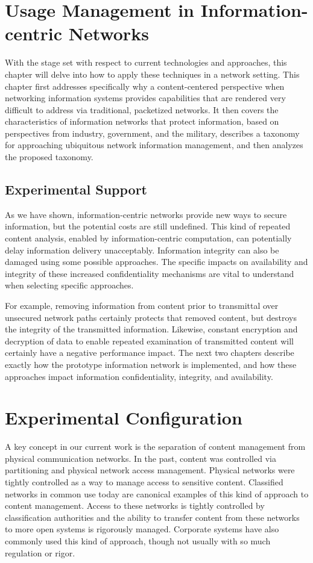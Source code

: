 \documentclass[botnum,fleqn,final]{unmeethesis}
\begin{document}
\chapter{Usage Management in Information-centric Networks}
With the stage set with respect to current technologies and approaches, this chapter will delve into how to apply these techniques in a network setting.  This chapter first addresses specifically why a content-centered perspective when networking information systems provides capabilities that are rendered very difficult to address via traditional, packetized networks.  It then covers the characteristics of information networks that protect information, based on perspectives from industry, government, and the military, describes a taxonomy for approaching ubiquitous network information management, and then analyzes the proposed taxonomy.




\section{Experimental Support}
As we have shown, information-centric networks provide new ways to secure information, but the potential costs are still undefined.  This kind of repeated content analysis, enabled by information-centric computation, can potentially delay information delivery unacceptably.  Information integrity can also be damaged using some possible approaches.  The specific impacts on availability and integrity of these increased confidentiality mechanisms are vital to understand when selecting specific approaches.

For example, removing information from content prior to transmittal over unsecured network paths certainly protects that removed content, but destroys the integrity of the transmitted information.  Likewise, constant encryption and decryption of data to enable repeated examination of transmitted content will certainly have a negative performance impact.  The next two chapters describe exactly how the prototype information network is implemented, and how these approaches impact information confidentiality, integrity, and availability.

\chapter{Experimental Configuration}
A key concept in our current work is the separation of content management from physical communication networks.  In the past, content was controlled via partitioning and physical network access management.  Physical networks were tightly controlled as a way to manage access to sensitive content.  Classified networks in common use today are canonical examples of this kind of approach to content management.  Access to these networks is tightly controlled by classification authorities and the ability to transfer content from these networks to more open systems is rigorously managed.  Corporate systems have also commonly used this kind of approach, though not usually with so much regulation or rigor.
\end{document}
